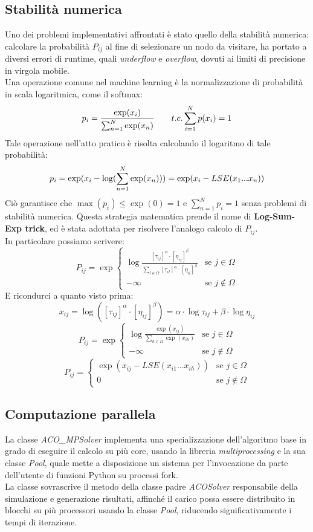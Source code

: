 \documentclass[11pt,a4paper]{article}
\begin{document}
\subsection{Stabilità numerica}
Uno dei problemi implementativi affrontati è stato quello della stabilità numerica: calcolare la probabilità \(P_{ij}\) al fine di selezionare un nodo da visitare, ha portato a diversi errori di runtime, quali \textit{underflow} e \textit{overflow}, dovuti ai limiti di precisione in virgola mobile.
\\Una operazione comune nel machine learning è la normalizzazione di probabilità in scala logaritmica, come il softmax:
\[
p_{i} = \frac{\exp(x_i)}{\sum_{n=1}^{N} \exp(x_n)} \qquad t.c. \space \sum_{i=1}^N p(x_i)=1
\]
Tale operazione nell'atto pratico è risolta calcolando il logaritmo di tale probabilità:
\[
p_i = \exp(\space x_i - \log(\sum_{n=1}^{N} \exp(x_n))\space) = \exp(\space x_i - LSE(x_1 ... x_n)\space)
\]
Ciò garantisce che  \(\max(p_i) \le \exp(0) = 1   \) e \(\sum_{n=1}^N p_i = 1\) senza problemi di stabilità numerica. Questa strategia matematica prende il nome di \textbf{Log-Sum-Exp trick}\cite{gundersen2020logsumexp}, ed è stata adottata per risolvere l'analogo calcolo di \(P_{ij}\).
\\In particolare possiamo scrivere:
\[
P_{ij} = 
\exp\begin{cases} 
\log\frac{[\tau_{ij}]^\alpha \cdot [\eta_{ij}]^\beta}{\sum_{l \in \Omega} [\tau_{il}]^\alpha \cdot [\eta_{il}]^\beta} & \text{se } j \in \Omega \\ 
-\infty & \text{se } j \notin \Omega 
\end{cases}
\]
E ricondurci a quanto visto prima:
\[
x_{ij} = \log([\tau_{ij}]^\alpha \cdot [\eta_{ij}]^\beta) = \alpha \cdot\log{\tau_{ij}} + \beta \cdot\log{\eta_{ij}}
\]
\[
P_{ij} = 
\exp\begin{cases} 
\log\frac{\exp(x_{ij})}{\sum_{h \in \Omega} {\exp(x_{ih})}} & \text{se } j \in \Omega \\ 
-\infty & \text{se } j \notin \Omega 
\end{cases}
\]
\[
P_{ij} = 
\begin{cases} 
\exp(x_{ij} - LSE(x_{i1}...x_{ih})) & \text{se } j \in \Omega  \\
0 & \text{se } j \notin \Omega 
\end{cases}
\]
\subsection{Computazione parallela}
La classe \textit{ACO\_MPSolver} implementa una specializzazione dell'algoritmo base in grado di eseguire il calcolo su più core, usando la libreria \textit{multiprocessing} e la sua classe \textit{Pool}, quale mette a disposizione un sistema per l'invocazione da parte dell'utente di funzioni Python su processi fork.
\\La classe sovrascrive il metodo della classe padre \textit{ACOSolver} responsabile della simulazione e generazione risultati, affinché il carico possa essere distribuito in blocchi su più processori usando la classe \textit{Pool}, riducendo significativamente i tempi di iterazione. 
\end{document}

